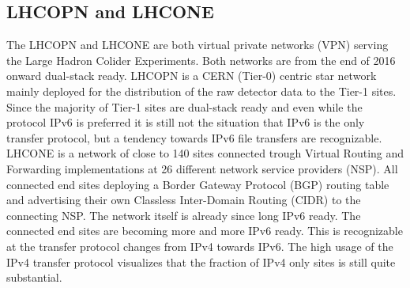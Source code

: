 \subsection{LHCOPN and LHCONE}

The LHCOPN and LHCONE are both virtual private networks (VPN) serving the Large Hadron Colider Experiments. Both networks are from the end of 2016 onward dual-stack ready. LHCOPN is a CERN (Tier-0) centric star network mainly deployed for the distribution of the raw detector data to the Tier-1 sites. Since the majority of Tier-1 sites are dual-stack ready and even while the protocol IPv6 is preferred it is still not the situation that IPv6 is the only transfer protocol, but a tendency towards IPv6 file transfers are recognizable. LHCONE is a network of close to 140 sites connected trough Virtual Routing and Forwarding implementations at 26 different network service providers (NSP). All connected end sites deploying a Border Gateway Protocol (BGP) routing table and advertising their own Classless Inter-Domain Routing (CIDR) to the connecting NSP. The network itself is already since long IPv6 ready. The connected end sites are becoming more and more IPv6 ready. This is recognizable at the  transfer protocol changes from IPv4 towards IPv6. The high usage of the IPv4 transfer protocol visualizes that the fraction of IPv4 only sites is still quite substantial.

